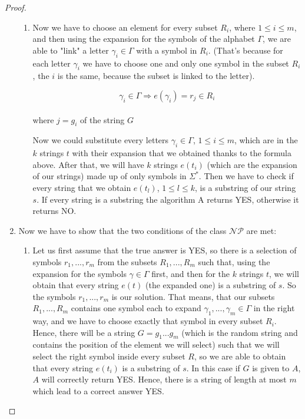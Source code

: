 \documentclass[paper=a4, fontsize=11pt]{scrartcl}
\numberwithin{equation}{section}		%
\numberwithin{figure}{section}			%
\numberwithin{table}{section}				%
\begin{document}
\begin{proof}
\begin{enumerate}
\begin{enumerate}
        	\item Now we have to choose an element for every subset $R_i$, where $1 \leq i \leq m$, and then using the expansion for the symbols of the alphabet $\Gamma$, we are able to "link" a letter $\gamma_i \in \Gamma$ with a symbol in $R_i$. (That's because for each letter $\gamma_i$ we have to choose one and only one symbol in the subset $R_i$, the $i$ is the same, because the subset is linked to the letter).
        	\begin{center}
        		$$\gamma_i \in \Gamma \Longrightarrow e(\gamma_i) = r_j \in R_i$$ \\
        		\noindent where $j=g_i$ of the string $G$
        	\end{center}
            Now we could substitute every letters $\gamma_i \in \Gamma$, $1\leq i \leq m$, which are in the $k$ strings $t$ with their expansion that we obtained thanks to the formula above. After that, we will have $k$ strings $e(t_i)$ (which are the expansion of our strings) made up of only symbols in $\Sigma^*$. \newline
            Then we have to check if every string that we obtain $e(t_l)$, $1\leq l\leq k$, is a substring of our string $s$. If every string is a substring the algorithm A returns YES, otherwise it returns NO.
        \end{enumerate}
        \item Now we have to show that the two conditions of the class $\mathcal{NP}$ are met:
        \begin{enumerate}
		   	\item Let us first assume that the true answer is YES, so there is a selection of symbols $r_1,...,r_m$ from the subsets $R_1,...,R_m$ such that, using the expansion for the symbols $\gamma \in \Gamma$ first, and then for the $k$ strings $t$, we will obtain that every string $e(t)$ (the expanded one) is a substring of $s$. So the symbols $r_1,...,r_m$ is our solution. That means, that our subsets $R_1,...,R_m$ contains one symbol each to expand $\gamma_1,...,\gamma_m \in \Gamma$ in the right way, and we have to choose exactly that symbol in every subset $R_i$. \newline
		   	Hence, there will be a string $G=g_1...g_m$ (which is the random string and contains the position of the element we will select) such that we will select the right symbol inside every subset $R$, so we are able to obtain that every string $e(t_i)$ is a substring of $s$. In this case if $G$ is given to $A$, $A$ will correctly return YES. Hence, there is a string of length at most $m$ which lead to a correct answer YES.

\end{enumerate}
\end{enumerate}
\end{proof}
\end{document}
